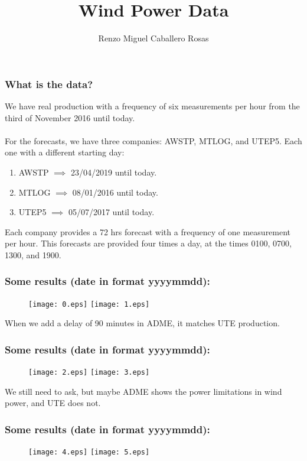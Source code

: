 \documentclass[aspectratio=169]{beamer}\usepackage[utf8]{inputenc}
\title{Wind Power Data}
\subtitle{Renzo Miguel Caballero Rosas}
\begin{document}
\begin{frame}
\titlepage
\end{frame}

\begin{frame}\frametitle{What is the data?}

We have real production with a frequency of six measurements per hour from the third of November 2016 until today.\\
\quad\\
For the forecasts, we have three companies: AWSTP, MTLOG, and UTEP5. Each one with a different starting day:
\begin{enumerate}

\item AWSTP $\implies$ 23/04/2019 until today.
\item MTLOG $\implies$ 08/01/2016 until today.
\item UTEP5 $\implies$ 05/07/2017 until today.

\end{enumerate}
Each company provides a 72 hrs forecast with a frequency of one measurement per hour. This forecasts are provided four times a day, at the times 0100, 0700, 1300, and 1900.

\end{frame}

\begin{frame}\frametitle{Some results (date in format yyyymmdd):}
\begin{figure}[ht!]
\centering
{\texttt{[image: 0.eps]}}\quad
{\texttt{[image: 1.eps]}}
\end{figure}
\alert{When we add a delay of 90 minutes in ADME, it matches UTE production.}
\end{frame}

\begin{frame}\frametitle{Some results (date in format yyyymmdd):}
\begin{figure}[ht!]
\centering
{\texttt{[image: 2.eps]}}\quad
{\texttt{[image: 3.eps]}}
\end{figure}
\alert{We still need to ask, but maybe ADME shows the power limitations in wind power, and UTE does not.}
\end{frame}

\begin{frame}\frametitle{Some results (date in format yyyymmdd):}
\begin{figure}[ht!]
\centering
{\texttt{[image: 4.eps]}}\quad
{\texttt{[image: 5.eps]}}
\end{figure}
\end{frame}
\end{document}

